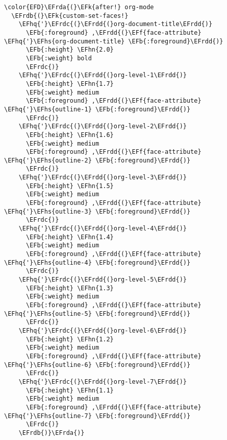 \documentclass{article}
\newcommand{\EFk}[1]{\textcolor{EFk}{#1}} %
\newcommand{\EFb}[1]{\textcolor{EFb}{#1}} %
\newcommand{\EFf}[1]{\textcolor{EFf}{#1}} %
\newcommand{\EFhn}[1]{\textcolor{EFhn}{\textbf{#1}}} %
\newcommand{\EFhq}[1]{#1} %
\newcommand{\EFhs}[1]{\textcolor{EFhs}{#1}} %
\newcommand{\EFrda}[1]{\textcolor{EFrda}{#1}} %
\newcommand{\EFrdb}[1]{\textcolor{EFrdb}{#1}} %
\newcommand{\EFrdc}[1]{\textcolor{EFrdc}{#1}} %
\newcommand{\EFrdd}[1]{\textcolor{EFrdd}{#1}} %
\begin{document}
\begin{Code}
\begin{Verbatim}
\color{EFD}\EFrda{(}\EFk{after!} org-mode
  \EFrdb{(}\EFk{custom-set-faces!}
    \EFhq{'}\EFrdc{(}\EFrdd{(}org-document-title\EFrdd{)}
      \EFb{:foreground} ,\EFrdd{(}\EFf{face-attribute} \EFhq{'}\EFhs{org-document-title} \EFb{:foreground}\EFrdd{)}
      \EFb{:height} \EFhn{2.0}
      \EFb{:weight} bold
      \EFrdc{)}
    \EFhq{'}\EFrdc{(}\EFrdd{(}org-level-1\EFrdd{)}
      \EFb{:height} \EFhn{1.7}
      \EFb{:weight} medium
      \EFb{:foreground} ,\EFrdd{(}\EFf{face-attribute} \EFhq{'}\EFhs{outline-1} \EFb{:foreground}\EFrdd{)}
      \EFrdc{)}
    \EFhq{'}\EFrdc{(}\EFrdd{(}org-level-2\EFrdd{)}
      \EFb{:height} \EFhn{1.6}
      \EFb{:weight} medium
      \EFb{:foreground} ,\EFrdd{(}\EFf{face-attribute} \EFhq{'}\EFhs{outline-2} \EFb{:foreground}\EFrdd{)}
      \EFrdc{)}
    \EFhq{'}\EFrdc{(}\EFrdd{(}org-level-3\EFrdd{)}
      \EFb{:height} \EFhn{1.5}
      \EFb{:weight} medium
      \EFb{:foreground} ,\EFrdd{(}\EFf{face-attribute} \EFhq{'}\EFhs{outline-3} \EFb{:foreground}\EFrdd{)}
      \EFrdc{)}
    \EFhq{'}\EFrdc{(}\EFrdd{(}org-level-4\EFrdd{)}
      \EFb{:height} \EFhn{1.4}
      \EFb{:weight} medium
      \EFb{:foreground} ,\EFrdd{(}\EFf{face-attribute} \EFhq{'}\EFhs{outline-4} \EFb{:foreground}\EFrdd{)}
      \EFrdc{)}
    \EFhq{'}\EFrdc{(}\EFrdd{(}org-level-5\EFrdd{)}
      \EFb{:height} \EFhn{1.3}
      \EFb{:weight} medium
      \EFb{:foreground} ,\EFrdd{(}\EFf{face-attribute} \EFhq{'}\EFhs{outline-5} \EFb{:foreground}\EFrdd{)}
      \EFrdc{)}
    \EFhq{'}\EFrdc{(}\EFrdd{(}org-level-6\EFrdd{)}
      \EFb{:height} \EFhn{1.2}
      \EFb{:weight} medium
      \EFb{:foreground} ,\EFrdd{(}\EFf{face-attribute} \EFhq{'}\EFhs{outline-6} \EFb{:foreground}\EFrdd{)}
      \EFrdc{)}
    \EFhq{'}\EFrdc{(}\EFrdd{(}org-level-7\EFrdd{)}
      \EFb{:height} \EFhn{1.1}
      \EFb{:weight} medium
      \EFb{:foreground} ,\EFrdd{(}\EFf{face-attribute} \EFhq{'}\EFhs{outline-7} \EFb{:foreground}\EFrdd{)}
      \EFrdc{)}
    \EFrdb{)}\EFrda{)}
\end{Verbatim}
\end{Code}
\end{document}
